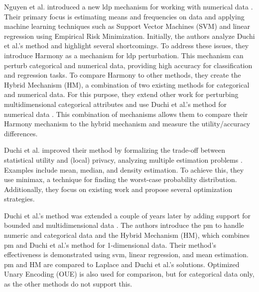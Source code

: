 Nguyen et al. introduced a new \gls{ldp} mechanism for working with numerical data \citep{nguyen_collecting_2016}.
Their primary focus is estimating means and frequencies on data and applying machine learning techniques such as Support Vector Machines (SVM) and linear regression using Empirical Risk Minimization.
Initially, the authors analyze Duchi et al.'s method \citep{duchi_privacy_2013} and highlight several shortcomings.
To address these issues, they introduce Harmony as a mechanism for \gls{ldp} perturbation.
This mechanism can perturb categorical and numerical data, providing high accuracy for classification and regression tasks.
To compare Harmony to other methods, they create the Hybrid Mechanism (HM), a combination of two existing methods for categorical and numerical data.
For this purpose, they extend other work \citep{bassily_local_2015} for perturbing multidimensional categorical attributes and use Duchi et al.'s method for numerical data \citep{duchi_privacy_2013}.
This combination of mechanisms allows them to compare their Harmony mechanism to the hybrid mechanism and measure the utility/accuracy differences.

Duchi et al. improved their method by formalizing the trade-off between statistical utility and (local) privacy, analyzing multiple estimation problems \citep{duchi_minimax_2017}.
Examples include mean, median, and density estimation.
To achieve this, they use minimax, a technique for finding the worst-case probability distribution.
Additionally, they focus on existing work and propose several optimization strategies.

Duchi et al.'s method was extended a couple of years later by adding support for bounded and multidimensional data \citep{wang_collecting_2019}.
The authors introduce the \gls{pm} to handle numeric and categorical data and the Hybrid Mechanism (HM), which combines \gls{pm} and Duchi et al.'s method for 1-dimensional data.
Their method's effectiveness is demonstrated using \gls{svm}, linear regression, and mean estimation.
\gls{pm} and HM are compared to Laplace and Duchi et al.'s solutions.
Optimized Unary Encoding (OUE) \citep{wang_locally_nodate} is also used for comparison, but for categorical data only, as the other methods do not support this.

